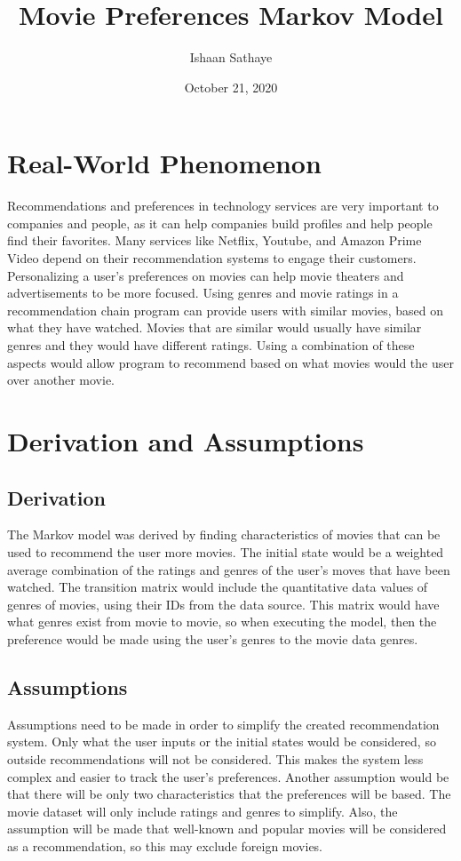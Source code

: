 \documentclass{article}
\title{Movie Preferences Markov Model}
\author{Ishaan Sathaye }
\date{October 21, 2020}
\begin{document}
\maketitle

\section{Real-World Phenomenon}
Recommendations and preferences in technology services are very important to 
companies and people, as it can help companies build profiles and help people find their favorites.
Many services like Netflix, Youtube, and Amazon Prime Video depend on their recommendation systems to engage their customers.
Personalizing a user's preferences on movies can help movie theaters and advertisements to be more focused. Using genres and movie ratings
in a recommendation chain program can provide users with similar movies, based on what they have watched. Movies that are similar would 
usually have similar genres and they would have different ratings. Using a combination of these aspects would allow program to 
recommend based on what movies would the user over another movie. 

\section{Derivation and Assumptions}
\subsection{Derivation}
The Markov model was derived by finding characteristics of movies that can be used to recommend the user more movies. The initial state would be 
a weighted average combination of the ratings and genres of the user's moves that have been watched. The transition matrix would include the 
quantitative data values of genres of movies, using their IDs from the data source. This matrix would have what genres exist from movie to movie, so 
when executing the model, then the preference would be made using the user's genres to the movie data genres.

\subsection{Assumptions}
Assumptions need to be made in order to simplify the created recommendation system. Only what the user inputs or the initial states
would be considered, so outside recommendations will not be considered. This makes the system less complex and easier to track the user's preferences. 
Another assumption would be that there will be only two characteristics that the preferences will be based. The movie dataset will only include ratings and 
genres to simplify. Also, the assumption will be made that well-known and popular movies will be considered as a recommendation, so this may exclude foreign movies.
\end{document}
